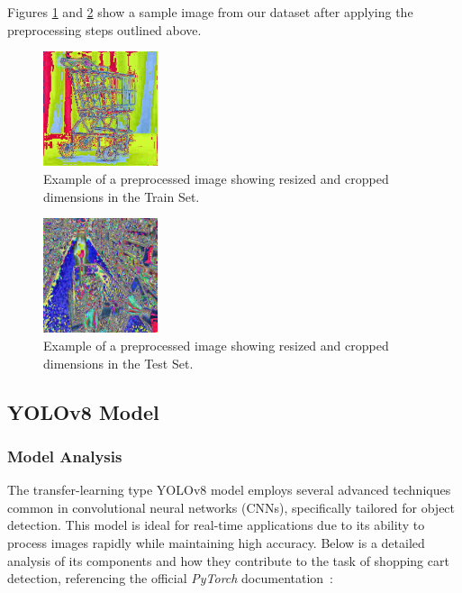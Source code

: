 \documentclass[10pt,twocolumn,letterpaper]{article}
\begin{document}
Figures \ref{fig:preprocessing1} and \ref{fig:preprocessing2} show a sample image from our dataset after applying the preprocessing steps outlined above.

\begin{figure}[ht]
    \centering
    \includegraphics[width=0.3\textwidth]{images/sp--13-_jpg.rf.95ce9b940a8c4ff08ff4b258cb562072.jpg}
    \caption{Example of a preprocessed image showing resized and cropped dimensions in the Train Set.}
    \label{fig:preprocessing1}
\end{figure}

\begin{figure}[ht]
    \centering
    \includegraphics[width=0.3\textwidth]{images/sp--228-_jpg.rf.7d3048d4b2fdd61f2dec2aacf2d05809.jpg}
    \caption{Example of a preprocessed image showing resized and cropped dimensions in the Test Set.}
    \label{fig:preprocessing2}
\end{figure}

\vspace{15pt}

\subsection{YOLOv8 Model}
\subsubsection{Model Analysis}
The transfer-learning type YOLOv8 model employs several advanced techniques common in convolutional neural networks (CNNs), specifically tailored for object detection. This model is ideal for real-time applications due to its ability to process images rapidly while maintaining high accuracy. Below is a detailed analysis of its components and how they contribute to the task of shopping cart detection, referencing the official \textit{PyTorch} documentation~\cite{pytorch}:
\end{document}
